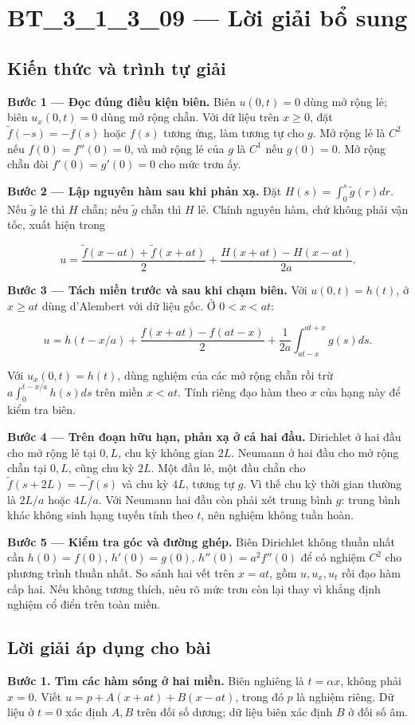 \documentclass[10pt,a4paper]{article}
\begin{document}
\section*{BT\_3\_1\_3\_09 — Lời giải bổ sung}
\subsection*{Kiến thức và trình tự giải}
\textbf{Bước 1 — Đọc đúng điều kiện biên.} Biên $u(0,t)=0$ dùng mở rộng lẻ; biên $u_x(0,t)=0$ dùng mở rộng chẵn. Với dữ liệu trên $x\ge0$, đặt $\widetilde f(-s)=-f(s)$ hoặc $f(s)$ tương ứng, làm tương tự cho $g$. Mở rộng lẻ là $C^2$ nếu $f(0)=f''(0)=0$, và mở rộng lẻ của $g$ là $C^1$ nếu $g(0)=0$. Mở rộng chẵn đòi $f'(0)=g'(0)=0$ cho mức trơn ấy.

\textbf{Bước 2 — Lập nguyên hàm sau khi phản xạ.} Đặt $H(s)=\int_0^s\widetilde g(r)dr$. Nếu $\widetilde g$ lẻ thì $H$ chẵn; nếu $\widetilde g$ chẵn thì $H$ lẻ. Chính nguyên hàm, chứ không phải vận tốc, xuất hiện trong


\[
u=\frac{\widetilde f(x-at)+\widetilde f(x+at)}2+\frac{H(x+at)-H(x-at)}{2a}.
\]


\textbf{Bước 3 — Tách miền trước và sau khi chạm biên.} Với $u(0,t)=h(t)$, ở $x\ge at$ dùng d'Alembert với dữ liệu gốc. Ở $0<x<at$:


\[
u=h(t-x/a)+\frac{f(x+at)-f(at-x)}2+\frac1{2a}\int_{at-x}^{at+x}g(s)ds.
\]


Với $u_x(0,t)=h(t)$, dùng nghiệm của các mở rộng chẵn rồi trừ $a\int_0^{t-x/a}h(s)ds$ trên miền $x<at$. Tính riêng đạo hàm theo $x$ của hạng này để kiểm tra biên.

\textbf{Bước 4 — Trên đoạn hữu hạn, phản xạ ở cả hai đầu.} Dirichlet ở hai đầu cho mở rộng lẻ tại $0,L$, chu kỳ không gian $2L$. Neumann ở hai đầu cho mở rộng chẵn tại $0,L$, cũng chu kỳ $2L$. Một đầu lẻ, một đầu chẵn cho $\widetilde f(s+2L)=-\widetilde f(s)$ và chu kỳ $4L$, tương tự $g$. Vì thế chu kỳ thời gian thường là $2L/a$ hoặc $4L/a$. Với Neumann hai đầu còn phải xét trung bình $g$: trung bình khác không sinh hạng tuyến tính theo $t$, nên nghiệm không tuần hoàn.

\textbf{Bước 5 — Kiểm tra góc và đường ghép.} Biên Dirichlet không thuần nhất cần $h(0)=f(0)$, $h'(0)=g(0)$, $h''(0)=a^2f''(0)$ để có nghiệm $C^2$ cho phương trình thuần nhất. So sánh hai vết trên $x=at$, gồm $u,u_x,u_t$ rồi đạo hàm cấp hai. Nếu không tương thích, nêu rõ mức trơn còn lại thay vì khẳng định nghiệm cổ điển trên toàn miền.
\subsection*{Lời giải áp dụng cho bài}
\textbf{Bước 1. Tìm các hàm sóng ở hai miền.} Biên nghiêng là $t=\alpha x$, không phải $x=0$. Viết $u=p+A(x+at)+B(x-at)$, trong đó $p$ là nghiệm riêng. Dữ liệu ở $t=0$ xác định $A,B$ trên đối số dương; dữ liệu biên xác định $B$ ở đối số âm.
\end{document}
